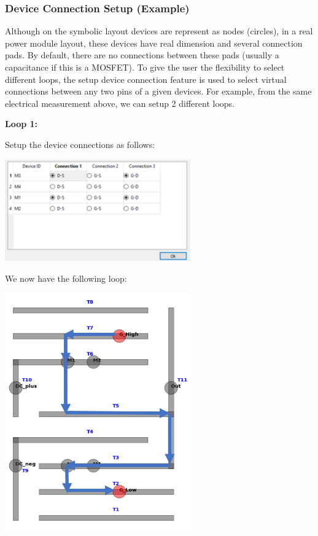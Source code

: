 \documentclass[11pt]{article}
\begin{document}
\pagebreak

\subsubsection{Device Connection Setup (Example)}
\label{sec-2-5-4}

Although on the symbolic layout devices are represent as nodes (circles), in a real power module layout, these devices have real dimension and several connection pads. By default, there are no connections between these pads (usually a capacitance if this is a MOSFET). To give the user the flexibility to select different loops, the setup device connection feature is used to select virtual connections between any two pins of a given devices. For example, from the same electrical measurement above, we can setup 2 different loops.

\textbf{Loop 1:}

Setup the device connections as follows:

\begin{center}
\includegraphics[width=8cm]{./figs/19_dconn.png}
\end{center}

We now have the following loop:

\begin{center}
\includegraphics[width=8cm]{./figs/20_Vloop.png}
\end{center}
\end{document}
